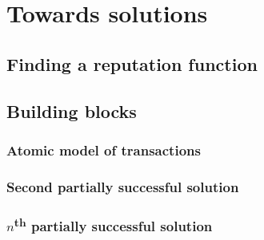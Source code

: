 \chapter{Towards solutions}
\section{Finding a reputation function}

\section{Building blocks}
\subsection{Atomic model of transactions}

\subsection{Second partially successful solution}
\subsection{$n$\textsuperscript{th} partially successful solution}
